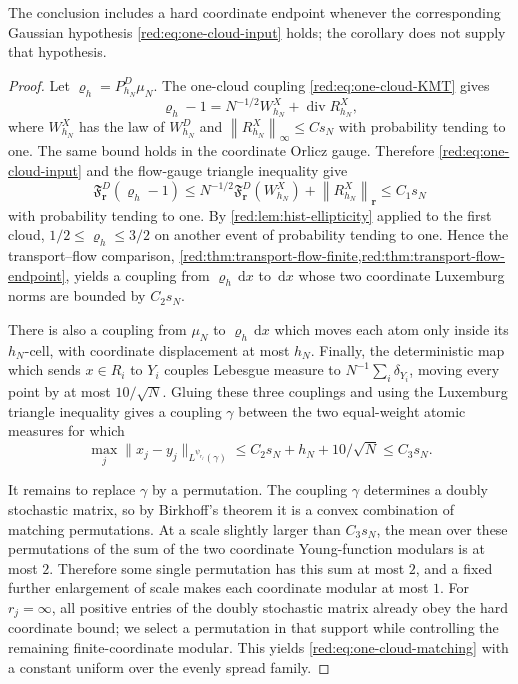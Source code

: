 \documentclass[11pt]{article}
\theoremstyle{definition}
\theoremstyle{remark}
\numberwithin{equation}{section}
\newcommand{\divv}{\operatorname{div}}
\newcommand{\norm}[1]{\left\|#1\right\|}
\newcommand{\dd}{\,\mathrm d}
\begin{document}
The conclusion includes a hard coordinate endpoint whenever the
corresponding Gaussian hypothesis \eqref{red:eq:one-cloud-input}
holds; the corollary does not supply that hypothesis.

\begin{proof}
Let $\varrho_h=P_{h_N}^D\mu_N$. The one-cloud coupling
\eqref{red:eq:one-cloud-KMT} gives
\[
 \varrho_h-1=N^{-1/2}W_{h_N}^X+\divv R_{h_N}^X,
\]
where $W_{h_N}^X$ has the law of $W_{h_N}^D$ and
$\norm{R_{h_N}^X}_\infty\le Cs_N$ with probability tending to one.
The same bound holds in the coordinate Orlicz gauge. Therefore
\eqref{red:eq:one-cloud-input} and the flow-gauge triangle inequality give
\[
 \mathfrak F_{\boldsymbol r}^D(\varrho_h-1)
 \le N^{-1/2}\mathfrak F_{\boldsymbol r}^D(W_{h_N}^X)
       +\norm{R_{h_N}^X}_{\boldsymbol r}
 \le C_1s_N
\]
with probability tending to one. By
\cref{red:lem:hist-ellipticity} applied to the first cloud,
$1/2\le\varrho_h\le3/2$ on another event of probability tending
to one. Hence the transport--flow comparison,
\cref{red:thm:transport-flow-finite,red:thm:transport-flow-endpoint},
yields a coupling from $\varrho_h\dd x$ to $\dd x$ whose two
coordinate Luxemburg norms are bounded by $C_2s_N$.

There is also a coupling from $\mu_N$ to $\varrho_h\dd x$ which
moves each atom only inside its $h_N$-cell, with coordinate
displacement at most $h_N$. Finally, the deterministic map which
sends $x\in R_i$ to $Y_i$ couples Lebesgue measure to
$N^{-1}\sum_i\delta_{Y_i}$, moving every point by at most
$10/\sqrt N$. Gluing these three couplings and using the
Luxemburg triangle inequality gives a coupling $\gamma$ between
the two equal-weight atomic measures for which
\[
 \max_j\|x_j-y_j\|_{L^{\psi_{r_j}}(\gamma)}
 \le C_2s_N+h_N+10/\sqrt N\le C_3s_N.
\]

It remains to replace $\gamma$ by a permutation. The coupling $\gamma$
determines a doubly stochastic matrix, so by Birkhoff's theorem it is a
convex combination of matching permutations. At a scale slightly larger
than $C_3s_N$, the mean over these permutations of the sum of the two
coordinate Young-function modulars is at most $2$. Therefore some
single permutation has this sum at most $2$, and a fixed further
enlargement of scale makes each coordinate modular at most $1$.
For $r_j=\infty$, all positive entries of the doubly stochastic
matrix already obey the hard coordinate bound; we select a
permutation in that support while controlling the remaining
finite-coordinate modular. This yields \eqref{red:eq:one-cloud-matching}
with a constant uniform over the evenly spread family.
\end{proof}
\end{document}
